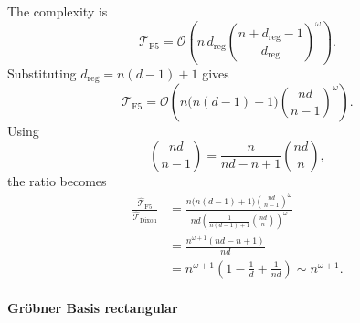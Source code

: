 The complexity is
\[
\mathcal T_{\mathrm{F5}}
=\mathcal O\!\left(n\,d_{\mathrm{reg}}\binom{n+d_{\mathrm{reg}}-1}{d_{\mathrm{reg}}}^{\omega}\right).
\]
Substituting $d_{\mathrm{reg}}=n(d-1)+1$ gives
\[
\mathcal T_{\mathrm{F5}}
=\mathcal O\!\left(n\bigl(n(d-1)+1\bigr)\binom{nd}{n-1}^{\omega}\right).
\]
Using
\[
\binom{nd}{n-1}=\frac{n}{nd-n+1}\binom{nd}{n},
\]
the ratio becomes
\begin{align*}
\frac{\widehat{\mathcal T}_{\mathrm{F5}}}{\widehat{\mathcal T}_{\mathrm{Dixon}}}
&=\frac{n\bigl(n(d-1)+1\bigr)\binom{nd}{n-1}^{\omega}}{nd\left(\frac{1}{n(d-1)+1}\binom{nd}{n}\right)^\omega}\\
&=\frac{n^{\omega+1}(nd-n+1)}{nd}\\
&=n^{\omega+1}\left(1-\frac1d+\frac1{nd}\right)
\sim n^{\omega+1}.
\end{align*}

\paragraph{Gr\"obner Basis rectangular~\cite{DBLP:journals/jsc/BardetFS15}}


